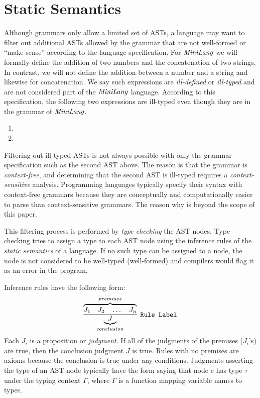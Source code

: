 \section{Static Semantics}
\label{sec:static}
Although grammars only allow a limited set of ASTs,
a language may want to filter out additional ASTs allowed by
the grammar that are not well-formed or ``make sense'' according to
the language specification.
For $\mathit{MiniLang}$ we will formally define the
addition of two numbers
and the concatenation of two strings.
In contrast, we will not define the
addition between a number and a string and
likewise for concatenation.
We say such expressions are \emph{ill-defined}
or \emph{ill-typed} and are not considered part of
the $\mathit{MiniLang}$ language.
According to this specification,
the following two expressions are ill-typed
even though they are in the grammar of $\mathit{MiniLang}$.

\begin{enumerate}
\item {}
\item {}
\end{enumerate}

Filtering out ill-typed ASTs is not always possible with only
the grammar specification such as the second AST above.
The reason is that the grammar is \emph{context-free},
and determining that the second AST is ill-typed requires
a \emph{context-sensitive} analysis.
Programming languages typically specify their syntax with
context-free grammars because they are conceptually and
computationally easier to parse than context-sensitive
grammars.
The reason why is beyond the scope of this paper.

This filtering process is performed by \emph{type checking}
the AST nodes.
Type checking tries to assign a type to each AST node
using the inference rules of the \emph{static semantics}
of a language.
If no such type can be assigned to a node, the node is
not considered to be well-typed (well-formed) and compilers would flag
it as an error in the program.

Inference rules have the following form:
\[
\infer[Rule Label]{\underbrace{J}_{conclusion}}
      {\overbrace{J_1 \quad J_2 \quad \ldots \quad J_n}^{premises}}
\]
Each $J_i$ is a proposition or \emph{judgment}.
If all of the judgments of the premises ($J_i$'s) are true,
then the conclusion judgment $J$ is true.
Rules with no premises are axioms because the conclusion
is true under any conditions.
Judgments asserting the type of an AST node typically have
the form \mbox{} saying that node $e$ has type
$\tau$ under the typing context $\Gamma$, where $\Gamma$
is a function mapping variable names to types.

